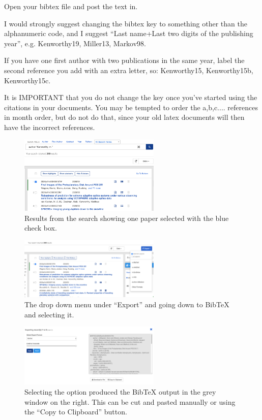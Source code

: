 \documentclass[a4,modern]{aastex63}
\begin{document}
Open your bibtex file and post the text in.

I would strongly suggest changing the bibtex key to something other than the alphanumeric code, and I suggest ``Last name+Last two digits of the publishing year'', e.g. Kenworthy19, Miller13, Markov98.

If you have one first author with two publications in the same year, label the second reference you add with an extra letter, so: Kenworthy15, Kenworthy15b, Kenworthy15c.

It is IMPORTANT that you do not change the key once you've started using the citations in your documents. You may be tempted to order the a,b,c.... references in month order, but do not do that, since your old latex documents will then have the incorrect references.

\begin{figure}[htp]
\centering
\includegraphics[angle=0,width=0.6\textwidth]{01_find_ref}
\caption{ \label{01find}Results from the search showing one paper selected with the blue check box.}
\end{figure}


\begin{figure}[htp]
\centering
\includegraphics[angle=0,width=0.6\textwidth]{02_select_export_citations}
\caption{ \label{02}The drop down menu under ``Export'' and going down to BibTeX and selecting it.}
\end{figure}


\begin{figure}[htp]
\centering
\includegraphics[angle=0,width=0.6\textwidth]{03_cut_and_paste}
\caption{ \label{03bib}Selecting the option produced the BibTeX output in the grey window on the right. This can be cut and pasted manually or using the ``Copy to Clipboard'' button.}
\end{figure}
\end{document}
